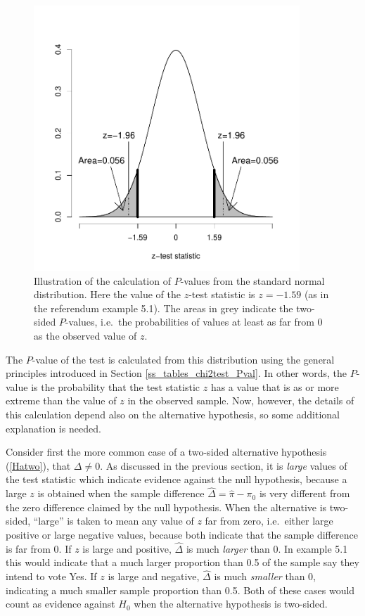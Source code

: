 \begin{figure}[t]
\caption{
Illustration of the calculation of $P$-values from the standard normal
distribution. Here the value of the $z$-test statistic is $z=-1.59$ (as
in the referendum example 5.1). The areas in grey indicate the two-sided
$P$-values, i.e.\ the probabilities of values at least as far from 0 as
the observed value of $z$.
}
\label{f_pval_prob}
\begin{center}

\includegraphics[width=10cm]{pval_zp}
\end{center}

\end{figure}

The $P$-value of the test is calculated from this distribution using the
general principles introduced in Section \ref{ss_tables_chi2test_Pval}.
In other words, the $P$-value is the probability that the test statistic
$z$ has a value that is as or more extreme than the value of $z$ in the
observed sample. Now, however, the details of this calculation depend
also on the alternative hypothesis, so some additional explanation is
needed.

Consider first the more common case of a two-sided alternative
hypothesis (\ref{Hatwo}), that $\Delta\ne 0$. As discussed in the
previous section, it is \emph{large} values of the test statistic which
indicate evidence against the null hypothesis, because a large $z$ is
obtained when the sample difference $\hat{\Delta}=\hat{\pi}-\pi_{0}$ is
very different from the zero difference claimed by the null hypothesis.
When the alternative is two-sided, ``large'' is taken to mean any value
of $z$ far from zero, i.e.\ either large positive or large negative
values, because both indicate that the sample difference is far from 0.
If $z$ is large and positive, $\hat{\Delta}$ is much \emph{larger} than
0. In example 5.1 this would indicate that a much larger proportion than
0.5 of the sample say they intend to vote Yes. If $z$ is
large and negative, $\hat{\Delta}$ is much \emph{smaller} than 0,
indicating a much smaller sample proportion than 0.5. Both of these
cases would count as evidence against $H_{0}$ when the alternative
hypothesis is two-sided.

